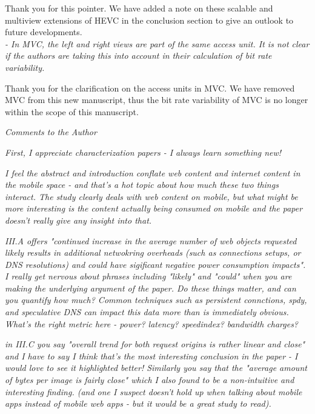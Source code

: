 \documentclass[11pt, draftclsnofoot, onecolumn]{IEEEtran}
\begin{document}
{{Thank you for this pointer. We have added a note on these scalable
and multiview extensions of HEVC in the conclusion section to
give an outlook to future developments.\\


\noindent \textit{ - In MVC, the left and right views are part of the
  same access unit. It is not clear if the authors are taking this
  into account in their calculation of bit rate variability.}

Thank you for the clarification on the access units in MVC.
We have removed MVC from this new manuscript, thus
the bit rate variability of MVC is no longer within the scope
of this manuscript.\\





\noindent \textit{Comments to the Author}



\noindent \textit{First, I appreciate characterization papers - I always learn something new!}

\noindent \textit{I feel the abstract and introduction conflate web content and internet content in the mobile space - and that's a hot topic about how much these two things interact. The study clearly deals with web content on mobile, but what might be more interesting is the content actually being consumed on mobile and the paper doesn't really give any insight into that.}


\noindent \textit{III.A offers "continued increase in the average number of web objects requested likely results in additional netwokring overheads (such as connections setups, or DNS resolutions) and could have sigificant negative power consumption impacts". I really get nervous about phrases including "likely" and "could" when you are making the underlying argument of the paper. Do these things matter, and can you quantify how much? Common techniques such as persistent connctions, spdy, and speculative DNS can impact this data more than is immediately obvious. What's the right metric here - power? latency? speedindex? bandwidth charges?}


\noindent \textit{in III.C you say "overall trend for both request origins is rather linear and close" and I have to say I think that's the most interesting conclusion in the paper - I would love to see it highlighted better! Similarly you say that the "average amount of bytes per image is fairly close" which I also found to be a non-intuitive and interesting finding. (and one I suspect doesn't hold up when talking about mobile apps instead of mobile web apps - but it would be a great study to read).}


}}
\end{document}
